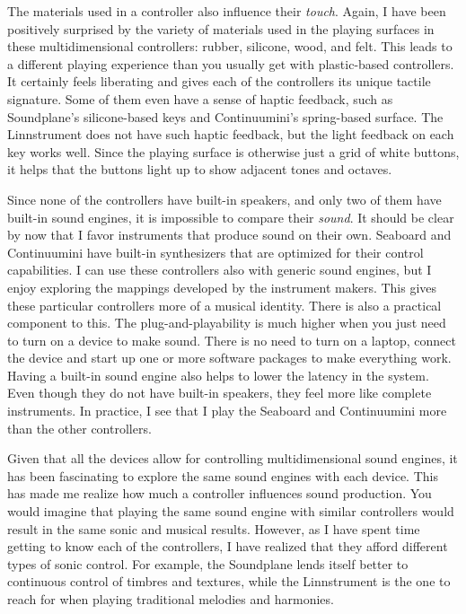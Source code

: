 The materials used in a controller also influence their \emph{touch}. Again, I have been positively surprised by the variety of materials used in the playing surfaces in these multidimensional controllers: rubber, silicone, wood, and felt. This leads to a different playing experience than you usually get with plastic-based controllers. It certainly feels liberating and gives each of the controllers its unique tactile signature. Some of them even have a sense of haptic feedback, such as Soundplane's silicone-based keys and Continuumini's spring-based surface. The Linnstrument does not have such haptic feedback, but the light feedback on each key works well. Since the playing surface is otherwise just a grid of white buttons, it helps that the buttons light up to show adjacent tones and octaves.

Since none of the controllers have built-in speakers, and only two of them have built-in sound engines, it is impossible to compare their \emph{sound}. It should be clear by now that I favor instruments that produce sound on their own. Seaboard and Continuumini have built-in synthesizers that are optimized for their control capabilities. I can use these controllers also with generic sound engines, but I enjoy exploring the mappings developed by the instrument makers. This gives these particular controllers more of a musical identity. There is also a practical component to this. The plug-and-playability is much higher when you just need to turn on a device to make sound. There is no need to turn on a laptop, connect the device and start up one or more software packages to make everything work. Having a built-in sound engine also helps to lower the latency in the system. Even though they do not have built-in speakers, they feel more like complete instruments. In practice, I see that I play the Seaboard and Continuumini more than the other controllers.

Given that all the devices allow for controlling multidimensional sound engines, it has been fascinating to explore the same sound engines with each device. This has made me realize how much a controller influences sound production. You would imagine that playing the same sound engine with similar controllers would result in the same sonic and musical results. However, as I have spent time getting to know each of the controllers, I have realized that they afford different types of sonic control. For example, the Soundplane lends itself better to continuous control of timbres and textures, while the Linnstrument is the one to reach for when playing traditional melodies and harmonies.

